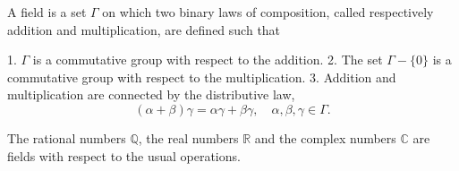 A field is a set $\Gamma$ on which two binary laws of composition, called respectively addition and multiplication, are defined such that

1. $\Gamma$ is a commutative group with respect to the addition.
2. The set $\Gamma - \{0\}$ is a commutative group with respect to the multiplication.
3. Addition and multiplication are connected by the distributive law,
$$(\alpha + \beta)\gamma = \alpha \gamma + \beta \gamma, \quad \alpha, \beta, \gamma \in \Gamma.$$

The rational numbers $\mathbb{Q}$, the real numbers $\mathbb{R}$ and the complex numbers $\mathbb{C}$ are fields with respect to the usual operations.
